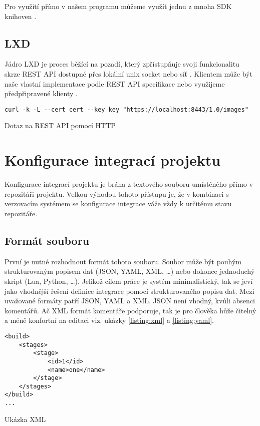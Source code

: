 Pro využití přímo v našem programu můžeme využít jednu z mnoha SDK knihoven \cite{docker_sdk}.

\subsection{LXD}

Jádro LXD je proces běžící na pozadí, který zpřístupňuje svoji funkcionalitu skrze REST API dostupné přes lokální unix socket nebo síť \cite{lxd}.
Klientem může být naše vlastní implementace podle REST API specifikace nebo využijeme předpřipravené klienty \cite{lxd_rest}.

\begin{listing}[ht]
\begin{verbatim}
curl -k -L --cert cert --key key "https://localhost:8443/1.0/images"
\end{verbatim}
\caption{Dotaz na REST API pomocí HTTP}
\end{listing}

\section{Konfigurace integrací projektu}

Konfigurace integrací projektu je brána z textového souboru umístěného přímo v repozitáři projektu.
Velkou výhodou tohoto přístupu je, že v kombinaci s verzovacím systémem se konfigurace integrace váže vždy k určitému stavu repozitáře.

\subsection{Formát souboru}

První je nutné rozhodnout formát tohoto souboru.
Soubor může být pouhým strukturovaným popisem dat (JSON, YAML, XML, \ldots) nebo dokonce jednoduchý skript (Lua, Python, \ldots).
Jelikož cílem práce je systém minimalistický, tak se jeví jako vhodnější řešení definice integrace pomocí strukturovaného popisu dat.
Mezi uvažované formáty patří JSON, YAML a XML.
JSON není vhodný, kvůli absenci komentářů.
Ač XML formát komentáře podporuje, tak je pro člověka hůže čitelný a méně konfortní na editaci viz. ukázky \ref{listing:xml} a \ref{listing:yaml}.

\begin{listing}[ht]
\begin{verbatim}
<build>
    <stages>
        <stage>
            <id>1</id>
            <name>one</name>
        </stage>
    </stages>
</build>
...
\end{verbatim}
\caption{Ukázka XML}
\label{listing:xml}
\end{listing}

